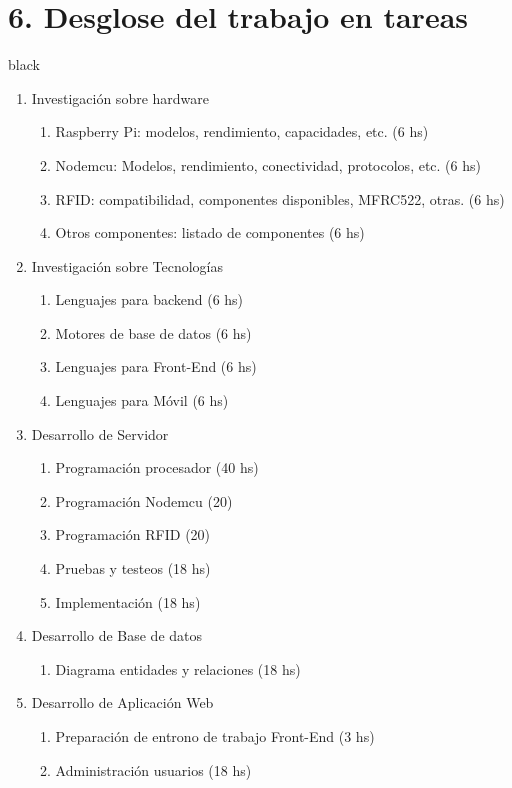 \documentclass[11pt]{charter}
\begin{document}
\section{6. Desglose del trabajo en tareas}
\label{sec:wbs}
\begin{consigna}{black}
\begin{enumerate}
\item Investigación sobre hardware
	\begin{enumerate}
	\item Raspberry Pi: modelos, rendimiento, capacidades, etc. (6 hs)
	\item Nodemcu: Modelos, rendimiento, conectividad, protocolos, etc.  (6 hs)
	\item RFID: compatibilidad, componentes disponibles, MFRC522, otras. (6 hs)
	\item Otros componentes: listado de componentes (6 hs)
	\end{enumerate}
\item Investigación sobre Tecnologías
	\begin{enumerate}
	\item Lenguajes para backend (6 hs)
	\item Motores de base de datos (6 hs)
	\item Lenguajes para Front-End (6 hs)
	\item Lenguajes para Móvil (6 hs)
	\end{enumerate}
\item Desarrollo de Servidor
	\begin{enumerate}
	\item Programación procesador (40 hs)
	\item Programación Nodemcu (20)
	\item Programación RFID (20)
	\item Pruebas y testeos (18 hs)
	\item Implementación (18 hs)
	\end{enumerate}
\item Desarrollo de Base de datos
	\begin{enumerate}
	\item Diagrama entidades y relaciones (18 hs)
	\end{enumerate}
\item Desarrollo de Aplicación Web
	\begin{enumerate}
	\item Preparación de entrono de trabajo Front-End (3 hs)
	\item Administración usuarios (18 hs)

\end{enumerate}
\end{enumerate}
\end{consigna}
\end{document}
